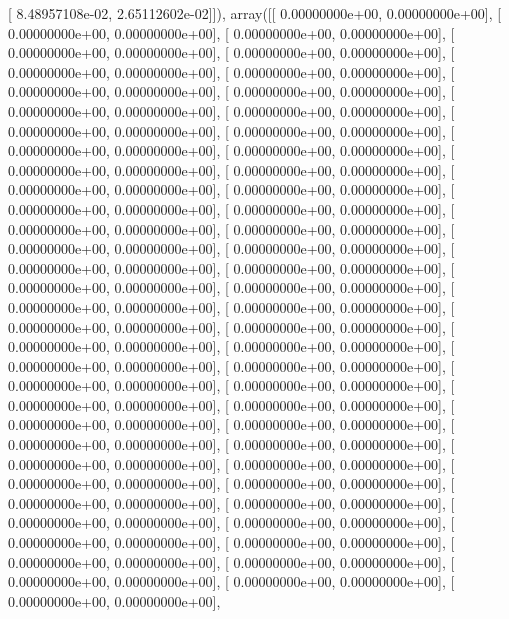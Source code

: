 \documentclass{article}
\begin{document}
       [ 8.48957108e-02,  2.65112602e-02]]), array([[ 0.00000000e+00,  0.00000000e+00],
       [ 0.00000000e+00,  0.00000000e+00],
       [ 0.00000000e+00,  0.00000000e+00],
       [ 0.00000000e+00,  0.00000000e+00],
       [ 0.00000000e+00,  0.00000000e+00],
       [ 0.00000000e+00,  0.00000000e+00],
       [ 0.00000000e+00,  0.00000000e+00],
       [ 0.00000000e+00,  0.00000000e+00],
       [ 0.00000000e+00,  0.00000000e+00],
       [ 0.00000000e+00,  0.00000000e+00],
       [ 0.00000000e+00,  0.00000000e+00],
       [ 0.00000000e+00,  0.00000000e+00],
       [ 0.00000000e+00,  0.00000000e+00],
       [ 0.00000000e+00,  0.00000000e+00],
       [ 0.00000000e+00,  0.00000000e+00],
       [ 0.00000000e+00,  0.00000000e+00],
       [ 0.00000000e+00,  0.00000000e+00],
       [ 0.00000000e+00,  0.00000000e+00],
       [ 0.00000000e+00,  0.00000000e+00],
       [ 0.00000000e+00,  0.00000000e+00],
       [ 0.00000000e+00,  0.00000000e+00],
       [ 0.00000000e+00,  0.00000000e+00],
       [ 0.00000000e+00,  0.00000000e+00],
       [ 0.00000000e+00,  0.00000000e+00],
       [ 0.00000000e+00,  0.00000000e+00],
       [ 0.00000000e+00,  0.00000000e+00],
       [ 0.00000000e+00,  0.00000000e+00],
       [ 0.00000000e+00,  0.00000000e+00],
       [ 0.00000000e+00,  0.00000000e+00],
       [ 0.00000000e+00,  0.00000000e+00],
       [ 0.00000000e+00,  0.00000000e+00],
       [ 0.00000000e+00,  0.00000000e+00],
       [ 0.00000000e+00,  0.00000000e+00],
       [ 0.00000000e+00,  0.00000000e+00],
       [ 0.00000000e+00,  0.00000000e+00],
       [ 0.00000000e+00,  0.00000000e+00],
       [ 0.00000000e+00,  0.00000000e+00],
       [ 0.00000000e+00,  0.00000000e+00],
       [ 0.00000000e+00,  0.00000000e+00],
       [ 0.00000000e+00,  0.00000000e+00],
       [ 0.00000000e+00,  0.00000000e+00],
       [ 0.00000000e+00,  0.00000000e+00],
       [ 0.00000000e+00,  0.00000000e+00],
       [ 0.00000000e+00,  0.00000000e+00],
       [ 0.00000000e+00,  0.00000000e+00],
       [ 0.00000000e+00,  0.00000000e+00],
       [ 0.00000000e+00,  0.00000000e+00],
       [ 0.00000000e+00,  0.00000000e+00],
       [ 0.00000000e+00,  0.00000000e+00],
       [ 0.00000000e+00,  0.00000000e+00],
       [ 0.00000000e+00,  0.00000000e+00],
       [ 0.00000000e+00,  0.00000000e+00],
       [ 0.00000000e+00,  0.00000000e+00],
       [ 0.00000000e+00,  0.00000000e+00],
       [ 0.00000000e+00,  0.00000000e+00],
       [ 0.00000000e+00,  0.00000000e+00],
       [ 0.00000000e+00,  0.00000000e+00],
       [ 0.00000000e+00,  0.00000000e+00],
       [ 0.00000000e+00,  0.00000000e+00],
       [ 0.00000000e+00,  0.00000000e+00],
\end{document}
